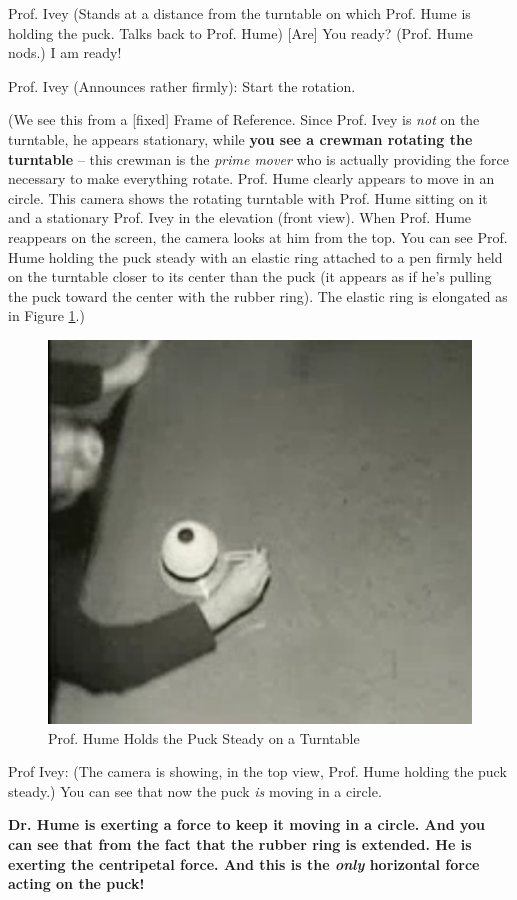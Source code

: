 \documentclass[a6paper]{article}
\begin{document}
Prof. Ivey (Stands at a distance from the turntable on which Prof. Hume is holding the puck. Talks back to Prof. Hume) [Are] You ready? (Prof. Hume nods.) I am ready! 

Prof. Ivey (Announces rather firmly): Start the rotation.

(We see this from a [fixed] Frame of Reference. Since Prof. Ivey is \emph{not} on the turntable, he appears stationary, while \textbf{you see a crewman rotating the turntable} -- this crewman is the \emph{prime mover} who is actually providing the force necessary to make everything rotate. Prof. Hume clearly appears to move in an circle. This camera shows the rotating turntable with Prof. Hume sitting on it and a stationary Prof. Ivey in the elevation (front view). When Prof. Hume reappears on the screen, the camera looks at him from the top. You can see Prof. Hume holding the puck steady with an elastic ring attached to a pen firmly held on the turntable closer to its center than the puck (it appears as if he's pulling the puck toward the center with the rubber ring). The elastic ring is elongated as in Figure \ref{fig: prof-hume-holds-the-puck-steady}.) 
        \begin{figure}[h!]
            \centering
            \includegraphics[width=0.5\linewidth]{prof-hume-holds-the-puck-steady.png}
            \caption{Prof. Hume Holds the Puck Steady on a Turntable}
            \label{fig: prof-hume-holds-the-puck-steady}
        \end{figure}

Prof Ivey: (The camera is showing, in the top view, Prof. Hume holding the puck steady.) You can see that now the puck \emph{is} moving in a circle. 

\textbf{Dr. Hume is exerting a force to keep it moving in a circle. And you can see that from the fact that the rubber ring is extended. He is exerting the centripetal force. And this is the \emph{only} horizontal force acting on the puck!} 
\end{document}
